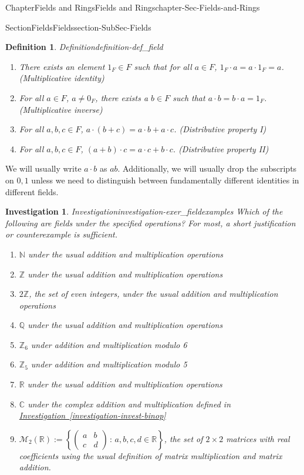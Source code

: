 \documentclass[oneside,10pt,]{book}
\newcommand{\xreffont}{\relax}
\numberwithin{equation}{section}
\newcommand{\setof}[2]{{\left\{#1\,\colon\,#2\right\}}}
\def\C{{\mathbb C}}
\def\Z{{\mathbb Z}}
\def\Q{{\mathbb Q}}
\def\N{{\mathbb N}}
\def\R{{\mathbb R}}
\newtheorem{definition}[theorem]{Definition}
\newtheorem{investigation}[theorem]{Investigation}
\newcommand{\amp}{&}
\begin{document}
\begin{chapterptx}{Chapter}{Fields and Rings}{}{Fields and Rings}{}{}{chapter-Sec-Fields-and-Rings}
\begin{sectionptx}{Section}{Fields}{}{Fields}{}{}{section-SubSec-Fields}
\begin{definition}{Definition}{}{definition-def_field}
\begin{enumerate}
\item{}There exists an element \(1_F\in F\) such that for all \(a\in F\), \(1_F\cdot a = a\cdot 1_F = a\). (Multiplicative identity)%
\item{}For all \(a\in F\), \(a\ne 0_F\), there exists a \(b\in F\) such that \(a\cdot b = b\cdot a = 1_F\). (Multiplicative inverse)%
\item{}For all \(a,b,c\in F\), \(a\cdot (b+c) = a\cdot b + a\cdot c\). (Distributive property I)%
\item{}For all \(a,b,c\in F\), \((a+b)\cdot c = a\cdot c + b\cdot c\). (Distributive property II)%
\end{enumerate}
%
\end{definition}
We will usually write \(a\cdot b\) as \(ab\). Additionally, we will usually drop the subscripts on \(0,1\) unless we need to distinguish between fundamentally different identities in different fields.%
\begin{investigation}{Investigation}{}{investigation-exer_fieldexamples}%
Which of the following are fields under the specified operations? For most, a short justification or counterexample is sufficient.%
\begin{enumerate}
\item{}\(\N\) under the usual addition and multiplication operations%
\item{}\(\Z\) under the usual addition and multiplication operations%
\item{}\(2\Z\), the set of even integers, under the usual addition and multiplication operations%
\item{}\(\Q\) under the usual addition and multiplication operations%
\item{}\(\Z_{6}\) under addition and multiplication modulo 6%
\item{}\(\Z_{5}\) under addition and multiplication modulo 5%
\item{}\(\R\) under the usual addition and multiplication operations%
\item{}\(\C\) under the complex addition and multiplication defined in \hyperref[investigation-invest-binop]{Investigation~{\xreffont\ref{investigation-invest-binop}}}%
\item{}\(\mathcal{M}_2(\R) := \setof{\left(\begin{matrix}a \amp b \\ c \amp d \end{matrix} \right)}{a,b,c,d\in\R}\)\footnotemark{}, the set of \(2\times 2\) matrices with real coefficients using the usual definition of matrix multiplication\footnotemark{} and matrix addition.%

\end{enumerate}
\end{investigation}
\end{sectionptx}
\end{chapterptx}
\end{document}
